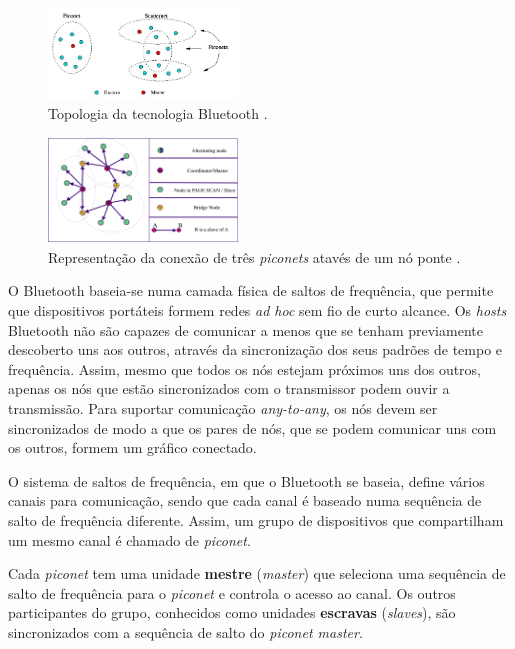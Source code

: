 \documentclass[conference]{IEEEtran}
\begin{document}
\begin{figure}[!t]
  \centering
  \includegraphics[width=0.45\textwidth]{Esquema_Bluetooth.png}
  \caption{Topologia da tecnologia Bluetooth \cite{blueesptec}.}
  \label{fig:topBluet}
\end{figure}

\begin{figure}[!t]
  \centering
  \includegraphics[width=0.45\textwidth]{no_ponte.png}
  \caption{Representação da conexão de três \textit{piconets} atavés de um nó ponte \cite{salonidis2005distributed}.}
  \label{fig:noPonte}
\end{figure}

O Bluetooth baseia-se numa camada física de saltos de frequência, que permite que dispositivos portáteis formem redes \textit{ad hoc} sem fio de curto alcance. 
Os \textit{hosts} Bluetooth não são capazes de comunicar a menos que se tenham previamente descoberto uns aos outros, através da sincronização dos seus padrões de tempo e frequência. 
Assim, mesmo que todos os nós estejam próximos uns dos outros, apenas os nós que estão sincronizados com o transmissor podem ouvir a transmissão.
Para suportar comunicação \textit{any-to-any}, os nós devem ser sincronizados de modo a que os pares de nós, que se podem comunicar uns com os outros, formem um gráfico conectado.

O sistema de saltos de frequência, em que o Bluetooth se baseia, define vários canais para comunicação, sendo que cada canal é baseado numa sequência de salto de frequência diferente. 
Assim, um grupo de dispositivos que compartilham um mesmo canal é chamado de \textit{piconet}. 

Cada \textit{piconet} tem uma unidade \textbf{mestre} (\textit{master}) que seleciona uma sequência de salto de frequência para o \textit{piconet} e controla o acesso ao canal. 
Os outros participantes do grupo, conhecidos como unidades \textbf{escravas} (\textit{slaves}), são sincronizados com a sequência de salto do \textit{piconet master}. 
\end{document}
